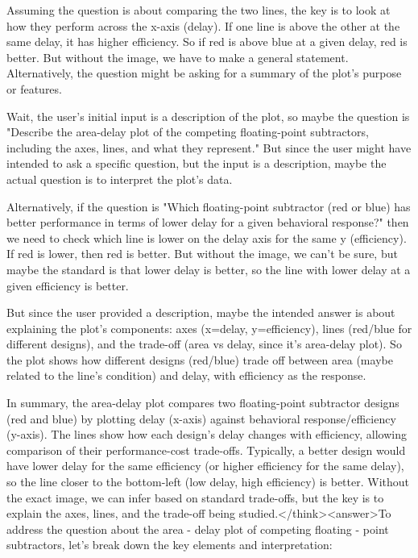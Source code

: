 Assuming the question is about comparing the two lines, the key is to look at how they perform across the x-axis (delay). If one line is above the other at the same delay, it has higher efficiency. So if red is above blue at a given delay, red is better. But without the image, we have to make a general statement. Alternatively, the question might be asking for a summary of the plot's purpose or features.

Wait, the user's initial input is a description of the plot, so maybe the question is "Describe the area-delay plot of the competing floating-point subtractors, including the axes, lines, and what they represent." But since the user might have intended to ask a specific question, but the input is a description, maybe the actual question is to interpret the plot's data.

Alternatively, if the question is "Which floating-point subtractor (red or blue) has better performance in terms of lower delay for a given behavioral response?" then we need to check which line is lower on the delay axis for the same y (efficiency). If red is lower, then red is better. But without the image, we can't be sure, but maybe the standard is that lower delay is better, so the line with lower delay at a given efficiency is better.

But since the user provided a description, maybe the intended answer is about explaining the plot's components: axes (x=delay, y=efficiency), lines (red/blue for different designs), and the trade-off (area vs delay, since it's area-delay plot). So the plot shows how different designs (red/blue) trade off between area (maybe related to the line's condition) and delay, with efficiency as the response.

In summary, the area-delay plot compares two floating-point subtractor designs (red and blue) by plotting delay (x-axis) against behavioral response/efficiency (y-axis). The lines show how each design's delay changes with efficiency, allowing comparison of their performance-cost trade-offs. Typically, a better design would have lower delay for the same efficiency (or higher efficiency for the same delay), so the line closer to the bottom-left (low delay, high efficiency) is better. Without the exact image, we can infer based on standard trade-offs, but the key is to explain the axes, lines, and the trade-off being studied.</think><answer>To address the question about the area - delay plot of competing floating - point subtractors, let's break down the key elements and interpretation:  

